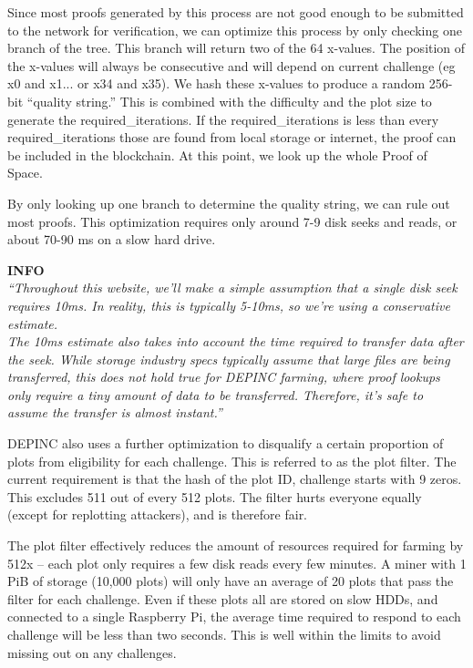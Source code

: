 \begin{flushleft}
    Since most proofs generated by this process are not good enough to be submitted to the network for verification, we can optimize this process by only checking one branch of the tree. This branch will return two of the 64 x-values. The position of the x-values will always be consecutive and will depend on current challenge (eg x0 and x1... or x34 and x35). We hash these x-values to produce a random 256-bit ``quality string.'' This is combined with the difficulty and the plot size to generate the required\_iterations. If the required\_iterations is less than every required\_iterations those are found from local storage or internet, the proof can be included in the blockchain. At this point, we look up the whole Proof of Space.
\end{flushleft}
\begin{flushleft}
    By only looking up one branch to determine the quality string, we can rule out most proofs. This optimization requires only around 7-9 disk seeks and reads, or about 70-90 ms on a slow hard drive.
\end{flushleft}
\begin{flushleft}
    \textbf{INFO}\\[5pt]
    \textit{``Throughout this website, we'll make a simple assumption that a single disk seek requires 10ms. In reality, this is typically 5-10ms, so we're using a conservative estimate.\\[5pt]
    The 10ms estimate also takes into account the time required to transfer data after the seek. While storage industry specs typically assume that large files are being transferred, this does not hold true for DEPINC farming, where proof lookups only require a tiny amount of data to be transferred. Therefore, it's safe to assume the transfer is almost instant.''}
\end{flushleft}
\begin{flushleft}
    DEPINC also uses a further optimization to disqualify a certain proportion of plots from eligibility for each challenge. This is referred to as the plot filter. The current requirement is that the hash of the plot ID, challenge starts with 9 zeros. This excludes 511 out of every 512 plots. The filter hurts everyone equally (except for replotting attackers), and is therefore fair.
\end{flushleft}
\begin{flushleft}
    The plot filter effectively reduces the amount of resources required for farming by 512x -- each plot only requires a few disk reads every few minutes. A miner with 1 PiB of storage (10,000 plots) will only have an average of 20 plots that pass the filter for each challenge. Even if these plots all are stored on slow HDDs, and connected to a single Raspberry Pi, the average time required to respond to each challenge will be less than two seconds. This is well within the limits to avoid missing out on any challenges.
\end{flushleft}
